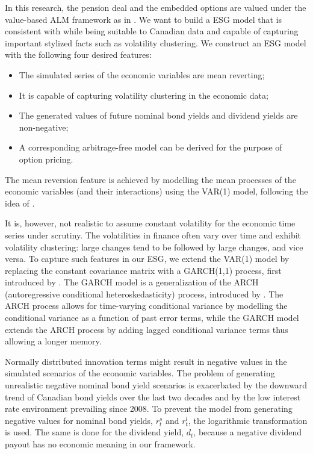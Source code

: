 \documentclass{sfuthesis}
\numberwithin{equation}{chapter}
\begin{document}
	
	
		\justify
		In this research, the pension deal and the embedded options are valued under the value-based ALM framework as in \citet{Hoevenaars2008}. We want to build a ESG model that is consistent with \citet{Hoevenaars2008} while being suitable to Canadian data and capable of capturing important stylized facts such as volatility clustering. We construct an ESG model with the following four desired features:
		\begin{itemize}
			\item The simulated series of the economic variables are mean reverting;
			\item It is capable of capturing volatility clustering in the economic data;
			\item The generated values of future nominal bond yields and dividend yields are non-negative;
			\item A corresponding arbitrage-free model can be derived for the purpose of option pricing.
			
		\end{itemize}
		The mean reversion feature is achieved by modelling the mean processes of the economic variables (and their interactions) using the VAR(1) model, following the idea of \citet{Hoevenaars2008}. 
	
		\justify
		It is, however, not realistic to assume constant volatility for the economic time series under scrutiny. The volatilities in finance often vary over time and exhibit volatility clustering: large changes tend to be followed by large changes, and vice versa. To capture such features in our ESG, we extend the VAR(1) model by replacing the constant covariance matrix with a GARCH(1,1) process, first introduced by \citet{Bollerslev1986}. The GARCH model is a generalization of the ARCH (autoregressive conditional heteroskedasticity) process, introduced by \citet{Engle1982}. The ARCH process allows for time-varying conditional variance by modelling the conditional variance as a function of past error terms, while the GARCH model extends the ARCH process by adding lagged conditional variance terms thus allowing a longer memory. 
	
	
		\justify
		Normally distributed innovation terms might result in negative values in the simulated scenarios of the economic variables. The problem of generating unrealistic negative nominal bond yield scenarios is exacerbated by the downward trend of Canadian bond yields over the last two decades and by the low interest rate environment prevailing since 2008. To prevent the model from generating negative values for nominal bond yields, $r_t^{s}$ and $r_t^{l}$, the logarithmic transformation is used. The same is done for the dividend yield, $d_t$, because a negative dividend payout has no economic meaning in our framework. 
	
\end{document}
